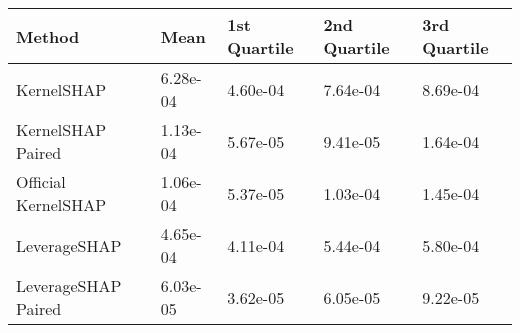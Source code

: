 \begin{tabular}{lllll}
  \toprule
  \textbf{Method} & \textbf{Mean} & \textbf{1st Quartile} & \textbf{2nd Quartile} & \textbf{3rd Quartile} \\ \midrule 
KernelSHAP & 6.28e-04 & 4.60e-04 & 7.64e-04 & 8.69e-04\\
KernelSHAP Paired & \cellcolor{bronze!60}1.13e-04 & \cellcolor{bronze!60}5.67e-05 & \cellcolor{silver!60}9.41e-05 & \cellcolor{bronze!60}1.64e-04\\
Official KernelSHAP & \cellcolor{silver!60}1.06e-04 & \cellcolor{silver!60}5.37e-05 & \cellcolor{bronze!60}1.03e-04 & \cellcolor{silver!60}1.45e-04\\
LeverageSHAP & 4.65e-04 & 4.11e-04 & 5.44e-04 & 5.80e-04\\
LeverageSHAP Paired & \cellcolor{gold!60}6.03e-05 & \cellcolor{gold!60}3.62e-05 & \cellcolor{gold!60}6.05e-05 & \cellcolor{gold!60}9.22e-05\\
\bottomrule
\end{tabular}